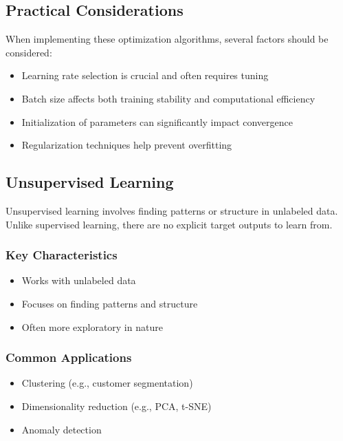 \subsection{Practical Considerations}

When implementing these optimization algorithms, several factors should be considered:

\begin{itemize}[noitemsep]
    \item Learning rate selection is crucial and often requires tuning
    \item Batch size affects both training stability and computational efficiency
    \item Initialization of parameters can significantly impact convergence
    \item Regularization techniques help prevent overfitting
\end{itemize}

\subsection{Unsupervised Learning}

Unsupervised learning involves finding patterns or structure in unlabeled data. Unlike supervised learning, there are no explicit target outputs to learn from.

\subsubsection{Key Characteristics}
\begin{itemize}[noitemsep]
    \item Works with unlabeled data
    \item Focuses on finding patterns and structure
    \item Often more exploratory in nature
\end{itemize}

\subsubsection{Common Applications}
\begin{itemize}[noitemsep]
    \item Clustering (e.g., customer segmentation)
    \item Dimensionality reduction (e.g., PCA, t-SNE)
    \item Anomaly detection
\end{itemize}

